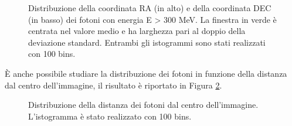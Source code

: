 \documentclass[a4paper,twocolumn]{article}
\begin{document}
\begin{large}
\begin{figure}[h]
    \caption{\small Distribuzione della coordinata RA (in alto) e della coordinata DEC (in basso) dei fotoni con energia E > 300 MeV. La finestra in verde è centrata nel valore medio e ha larghezza pari al doppio della deviazione standard. Entrambi gli istogrammi sono stati realizzati con 100 bins.}
    \label{c_dist}
\end{figure} 

\noindent 
È anche possibile studiare la distribuzione dei fotoni in funzione della distanza dal centro dell'immagine, il risultato è riportato in Figura \ref{d300}. 

\begin{figure}[h]
    \caption{\small Distribuzione della distanza dei fotoni dal centro dell'immagine. L'istogramma è stato realizzato con 100 bins.}
    \label{d300}
\end{figure}


\end{large}
\end{document}
